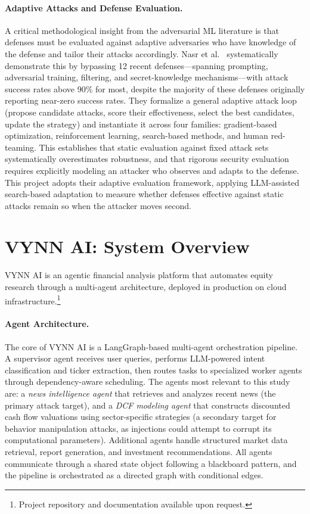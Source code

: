 \documentclass[letterpaper,twocolumn,10pt]{article}
\begin{document}
\paragraph{Adaptive Attacks and Defense Evaluation.}
A critical methodological insight from the adversarial ML literature is that defenses must be evaluated against adaptive adversaries who have knowledge of the defense and tailor their attacks accordingly. Nasr et al.~\cite{nasr2025attacker} systematically demonstrate this by bypassing 12 recent defenses---spanning prompting, adversarial training, filtering, and secret-knowledge mechanisms---with attack success rates above 90\% for most, despite the majority of these defenses originally reporting near-zero success rates. They formalize a general adaptive attack loop (propose candidate attacks, score their effectiveness, select the best candidates, update the strategy) and instantiate it across four families: gradient-based optimization, reinforcement learning, search-based methods, and human red-teaming. This establishes that static evaluation against fixed attack sets systematically overestimates robustness, and that rigorous security evaluation requires explicitly modeling an attacker who observes and adapts to the defense. This project adopts their adaptive evaluation framework, applying LLM-assisted search-based adaptation to measure whether defenses effective against static attacks remain so when the attacker moves second.

\section{VYNN AI: System Overview}

VYNN AI is an agentic financial analysis platform that automates equity research through a multi-agent architecture, deployed in production on cloud infrastructure.\footnote{Project repository and documentation available upon request.}

\paragraph{Agent Architecture.}
The core of VYNN AI is a LangGraph-based multi-agent orchestration pipeline. A supervisor agent receives user queries, performs LLM-powered intent classification and ticker extraction, then routes tasks to specialized worker agents through dependency-aware scheduling. The agents most relevant to this study are: a \textit{news intelligence agent} that retrieves and analyzes recent news (the primary attack target), and a \textit{DCF modeling agent} that constructs discounted cash flow valuations using sector-specific strategies (a secondary target for behavior manipulation attacks, as injections could attempt to corrupt its computational parameters). Additional agents handle structured market data retrieval, report generation, and investment recommendations. All agents communicate through a shared state object following a blackboard pattern, and the pipeline is orchestrated as a directed graph with conditional edges.
\end{document}
